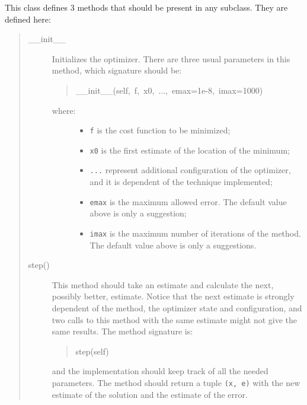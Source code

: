 This class defines 3 methods that should be present in any subclass. They
are defined here:
%
\begin{quote}
%
\begin{description}
\item[{\_\_init\_\_}] \leavevmode 
Initializes the optimizer. There are three usual parameters in this
method, which signature should be:
%
\begin{quote}{\ttfamily \raggedright \noindent
\_\_init\_\_(self,~f,~x0,~...,~emax=1e-8,~imax=1000)
}
\end{quote}
%
\begin{description}
\item[{where:}] \leavevmode %
\begin{itemize}

\item \texttt{f} is the cost function to be minimized;

\item \texttt{x0} is the first estimate of the location of the minimum;

\item \texttt{...} represent additional configuration of the optimizer, and it
is dependent of the technique implemented;

\item \texttt{emax} is the maximum allowed error. The default value above is
only a suggestion;

\item \texttt{imax} is the maximum number of iterations of the method. The
default value above is only a suggestions.

\end{itemize}

\end{description}

\item[{step()}] \leavevmode 
This method should take an estimate and calculate the next, possibly
better, estimate. Notice that the next estimate is strongly dependent of
the method, the optimizer state and configuration, and two calls to this
method with the same estimate might not give the same results. The
method signature is:
%
\begin{quote}{\ttfamily \raggedright \noindent
step(self)
}
\end{quote}

and the implementation should keep track of all the needed parameters.
The method should return a tuple \texttt{(x, e)} with the new estimate of the
solution and the estimate of the error.


\end{description}
\end{quote}
